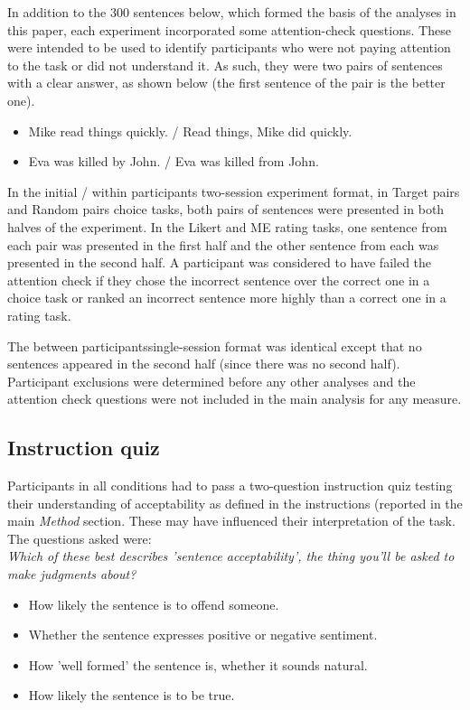 \documentclass[doc]{apa6}
\newcommand{\targchoice}{{\sc Target pairs}}
\newcommand{\rndchoice}{{\sc Random pairs}}
\newcommand{\ME}{{\sc ME}}%
\newcommand{\likert}{{\sc Likert}}
\newcommand{\choicetask}{choice task}
\newcommand{\ratingtask}{rating task}
\newcommand{\initial}{{\sc initial}}
\newcommand{\withinppnt}{{\sc within participants}}
\newcommand{\betweenppnt}{{\sc between participants}}
\begin{document}
In addition to the 300 sentences below, which formed the basis of the analyses in this paper, each experiment incorporated some attention-check questions. These were intended to be used to identify participants who were not paying attention to the task or did not understand it. As such, they were two pairs of sentences with a clear answer, as shown below (the first sentence of the pair is the better one).

\begin{itemize}
\item Mike read things quickly. / Read things, Mike did quickly.
\item Eva was killed by John. / Eva was killed from John.
\end{itemize}

 In the \initial{} / \withinppnt{} two-session experiment format, in \targchoice{} and \rndchoice{} {\choicetask}s, both pairs of sentences were presented in both halves of the experiment. In the \likert{} and \ME{} {\ratingtask}s, one sentence from each pair was presented in the first half and the other sentence from each was presented in the second half. A participant was considered to have failed the attention check if they chose the incorrect sentence over the correct one in a \choicetask{} or ranked an incorrect sentence more highly than a correct one in a \ratingtask.

The \betweenppnt single-session format was identical except that no sentences appeared in the second half (since there was no second half). Participant exclusions were determined before any other analyses and the attention check questions were not included in the main analysis for any measure.

\subsection{Instruction quiz}
Participants in all conditions had to pass a two-question instruction quiz testing their understanding of acceptability as defined in the instructions (reported in the main {\it Method} section. These may have influenced their interpretation of the task. The questions asked were:\\

{\it Which of these best describes 'sentence acceptability', the thing you'll be asked to make judgments about?}
\begin{itemize}
  \item How likely the sentence is to offend someone.
  \item Whether the sentence expresses positive or negative sentiment.
  \item How 'well formed' the sentence is, whether it sounds natural.
  \item How likely the sentence is to be true.
\end{itemize}
\end{document}
